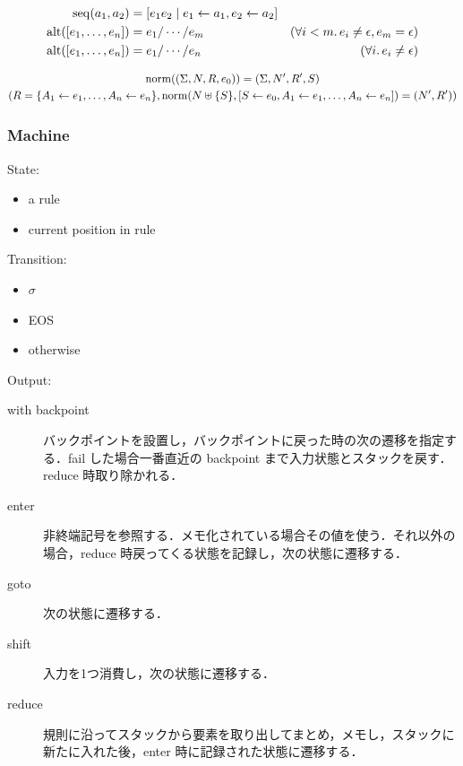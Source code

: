 \begin{align*}
  \mathop{\mathrm{seq}}(a_1, a_2) &= [e_1 e_2 \mid e_1 \gets a_1, e_2 \gets a_2] \\
  \mathop{\mathrm{alt}}([e_1, \ldots, e_n]) &= e_1 / \cdots / e_m &(\forall i < m\ldotp e_i \neq \epsilon, e_m = \epsilon) \\
  \mathop{\mathrm{alt}}([e_1, \ldots, e_n]) &= e_1 / \cdots / e_n &(\forall i\ldotp e_i \neq \epsilon)
\end{align*}

\begin{gather*}
  \mathop{\mathrm{norm}}((\Sigma, N, R, e_0)) = (\Sigma, N', R', S) \\
  (R = \{A_1 \gets e_1, \ldots, A_n \gets e_n\}, \mathop{\mathrm{norm}}(N \uplus \{S\}, [S \gets e_0, A_1 \gets e_1, \ldots, A_n \gets e_n]) = (N', R'))
\end{gather*}

\subsubsection{Machine}

State:
\begin{itemize}
  \item a rule
  \item current position in rule
\end{itemize}

Transition:
\begin{itemize}
  \item $\sigma$
  \item EOS
  \item otherwise
\end{itemize}

Output:
\begin{description}
  \item[with backpoint] バックポイントを設置し，バックポイントに戻った時の次の遷移を指定する．fail した場合一番直近の backpoint まで入力状態とスタックを戻す．reduce 時取り除かれる．
  \item[enter] 非終端記号を参照する．メモ化されている場合その値を使う．それ以外の場合，reduce 時戻ってくる状態を記録し，次の状態に遷移する．
  \item[goto] 次の状態に遷移する．
  \item[shift] 入力を1つ消費し，次の状態に遷移する．
  \item[reduce] 規則に沿ってスタックから要素を取り出してまとめ，メモし，スタックに新たに入れた後，enter 時に記録された状態に遷移する．
\end{description}

